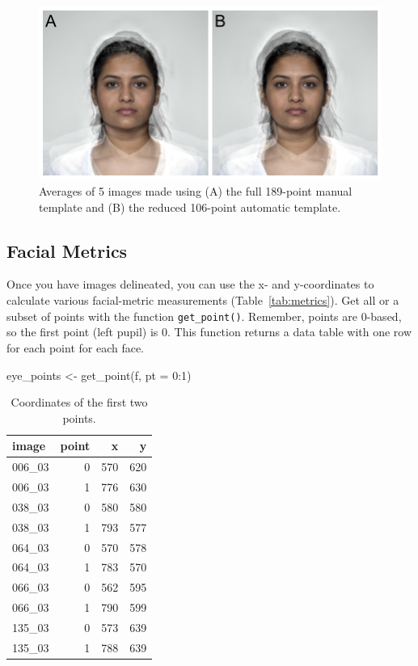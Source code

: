 \documentclass[
  doc,floatsintext]{apa6}
\newenvironment{Shaded}{\begin{snugshade}}{\end{snugshade}}
\newcommand{\AttributeTok}[1]{\textcolor[rgb]{0.77,0.63,0.00}{#1}}
\newcommand{\DecValTok}[1]{\textcolor[rgb]{0.00,0.00,0.81}{#1}}
\newcommand{\FunctionTok}[1]{\textcolor[rgb]{0.00,0.00,0.00}{#1}}
\newcommand{\NormalTok}[1]{#1}
\newcommand{\OtherTok}[1]{\textcolor[rgb]{0.56,0.35,0.01}{#1}}
\newcommand{\SpecialCharTok}[1]{\textcolor[rgb]{0.00,0.00,0.00}{#1}}
\begin{document}
\begin{figure}
\includegraphics[width=1\linewidth]{index_files/figure-latex/avg-comp-1} \caption{Averages of 5 images made using (A) the full 189-point manual template and (B) the reduced 106-point automatic template.}\label{fig:avg-comp}
\end{figure}

\hypertarget{facial-metrics}{%
\subsection{Facial Metrics}\label{facial-metrics}}

Once you have images delineated, you can use the x- and y-coordinates to calculate various facial-metric measurements (Table~\ref{tab:metrics}). Get all or a subset of points with the function \texttt{get\_point()}. Remember, points are 0-based, so the first point (left pupil) is 0. This function returns a data table with one row for each point for each face.

\begin{Shaded}
\begin{Highlighting}[]
\NormalTok{eye\_points }\OtherTok{\textless{}{-}} \FunctionTok{get\_point}\NormalTok{(f, }\AttributeTok{pt =} \DecValTok{0}\SpecialCharTok{:}\DecValTok{1}\NormalTok{)}
\end{Highlighting}
\end{Shaded}

\begin{table}

\caption{\label{tab:unnamed-chunk-7}Coordinates of the first two points.}
\centering
\begin{tabular}[t]{l|r|r|r}
\hline
image & point & x & y\\
\hline
006\_03 & 0 & 570 & 620\\
\hline
006\_03 & 1 & 776 & 630\\
\hline
038\_03 & 0 & 580 & 580\\
\hline
038\_03 & 1 & 793 & 577\\
\hline
064\_03 & 0 & 570 & 578\\
\hline
064\_03 & 1 & 783 & 570\\
\hline
066\_03 & 0 & 562 & 595\\
\hline
066\_03 & 1 & 790 & 599\\
\hline
135\_03 & 0 & 573 & 639\\
\hline
135\_03 & 1 & 788 & 639\\
\hline
\end{tabular}
\end{table}
\end{document}
